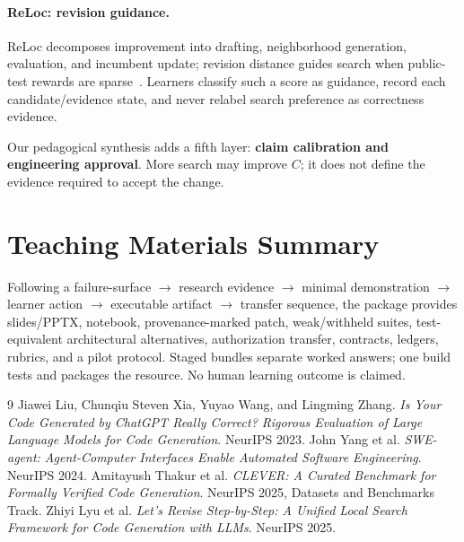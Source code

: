 \documentclass{article}
\begin{document}
\paragraph{ReLoc: revision guidance.} ReLoc decomposes improvement into drafting, neighborhood generation, evaluation, and incumbent update; revision distance guides search when public-test rewards are sparse~\citep{reloc}. Learners classify such a score as guidance, record each candidate/evidence state, and never relabel search preference as correctness evidence.

Our pedagogical synthesis adds a fifth layer: \textbf{claim calibration and engineering approval}. More search may improve $C$; it does not define the evidence required to accept the change.

\section{Teaching Materials Summary}
Following a failure-surface $\rightarrow$ research evidence $\rightarrow$ minimal demonstration $\rightarrow$ learner action $\rightarrow$ executable artifact $\rightarrow$ transfer sequence, the package provides slides/PPTX, notebook, provenance-marked patch, weak/withheld suites, test-equivalent architectural alternatives, authorization transfer, contracts, ledgers, rubrics, and a pilot protocol. Staged bundles separate worked answers; one build tests and packages the resource. No human learning outcome is claimed.

{\footnotesize
\begin{thebibliography}{9}
 Jiawei Liu, Chunqiu Steven Xia, Yuyao Wang, and Lingming Zhang. \emph{Is Your Code Generated by ChatGPT Really Correct? Rigorous Evaluation of Large Language Models for Code Generation}. NeurIPS 2023.
 John Yang et al. \emph{SWE-agent: Agent-Computer Interfaces Enable Automated Software Engineering}. NeurIPS 2024.
 Amitayush Thakur et al. \emph{CLEVER: A Curated Benchmark for Formally Verified Code Generation}. NeurIPS 2025, Datasets and Benchmarks Track.
 Zhiyi Lyu et al. \emph{Let's Revise Step-by-Step: A Unified Local Search Framework for Code Generation with LLMs}. NeurIPS 2025.
\end{thebibliography}
}
\end{document}
